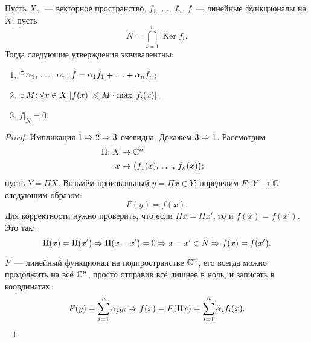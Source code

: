 \documentclass{notes}
\DeclareMathOperator{\Ker}{Ker}
\begin{document}
	\begin{lm} \label{lm:lin-spc}
		Пусть $X_n$~--- векторное пространство, $f_1, \, \ldots, \, f_n, \, f$~--- линейные функционалы на $X$; пусть 
		\[
			N = \bigcap\limits_{i = 1}^n \Ker f_i.
		\]
		Тогда следующие утверждения эквивалентны:
		\begin{enumerate}
			\item $\exists \, \alpha_1, \, \ldots, \, \alpha_n\text{\text{:}} \; f = \alpha_1 f_1 + \ldots + \alpha_n f_n$;
			\item $\exists \, M \text{\text{:}} \; \forall x \in X \; |f(x)| \leqslant M \cdot \max |f_i(x)|$;
			\item $f|_{N} = 0$.
		\end{enumerate}
		\begin{proof}
			Импликация $1 \Rightarrow 2 \Rightarrow 3$ очевидна. Докажем $3 \Rightarrow 1$. Рассмотрим
			\begin{align*}
				\Pi\text{\text{:}} \; X &\to \mathbb{C}^n & \\
				x &\mapsto \big(f_1(x), \, \ldots, \, f_n(x)\big);
			\end{align*}
			пусть $Y = \Pi X$. Возьмём произвольный $y = \Pi x \in Y$; определим $F\text{\text{:}} \; Y \to \mathbb{C}$ следующим образом:
			\[
				F(y) = f(x).
			\]
			Для корректности нужно проверить, что если $\Pi x = \Pi x'$, то и $f(x) = f(x')$. Это так:
			\[
				\Pi(x) = \Pi(x') \Rightarrow \Pi(x - x') = 0 \Rightarrow x - x' \in N \Rightarrow f(x) = f(x').
			\]

			$F$~--- линейный функционал на подпространстве $\mathbb{C}^n$, его всегда можно продолжить на всё $\mathbb{C}^n$, просто отправив всё лишнее в ноль, и записать в координатах:
			\[
				F(y) = \sum\limits_{i = 1}^n \alpha_i y_i \Rightarrow f(x) = F(\Pi x) = \sum\limits_{i = 1}^n \alpha_i f_i(x).
			\]
		\end{proof}
	\end{lm}
\end{document}
